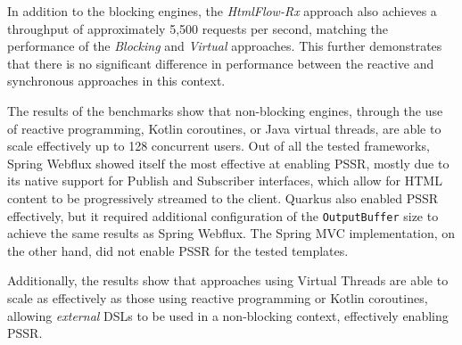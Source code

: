 In addition to the blocking engines, the \textit{HtmlFlow-Rx} approach also
achieves a throughput of approximately 5,500 requests per second, matching the
performance of the \textit{Blocking} and \textit{Virtual} approaches. This
further demonstrates that there is no significant difference in performance
between the reactive and synchronous approaches in this context.

The results of the benchmarks show that non-blocking engines, through the use
of reactive programming, Kotlin coroutines, or Java virtual threads, are able
to scale effectively up to 128 concurrent users. Out of all the tested
frameworks, Spring Webflux showed itself the most effective at enabling PSSR,
mostly due to its native support for Publish and Subscriber interfaces, which
allow for HTML content to be progressively streamed to the client. Quarkus also
enabled PSSR effectively, but it required additional configuration of the
\texttt{OutputBuffer} size to achieve the same results as Spring Webflux. The
Spring MVC implementation, on the other hand, did not enable PSSR for the
tested templates.

Additionally, the results show that approaches using Virtual Threads are able
to scale as effectively as those using reactive programming or Kotlin
coroutines, allowing \textit{external} DSLs to be used in a non-blocking
context, effectively enabling PSSR\@.